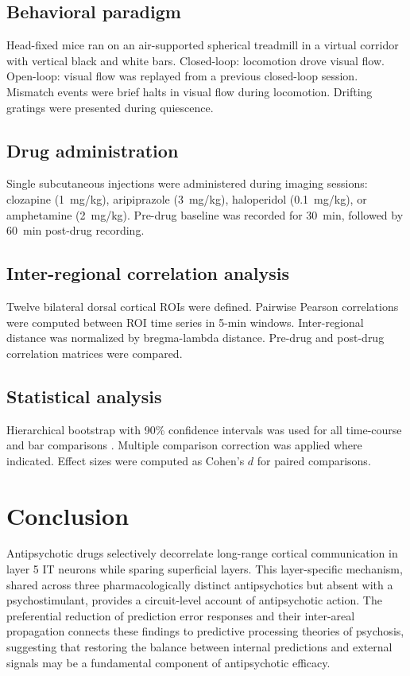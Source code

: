 \documentclass[11pt]{article}
\begin{document}
\subsection{Behavioral paradigm}

Head-fixed mice ran on an air-supported spherical treadmill in a virtual corridor with vertical black and white bars. Closed-loop: locomotion drove visual flow. Open-loop: visual flow was replayed from a previous closed-loop session. Mismatch events were brief halts in visual flow during locomotion. Drifting gratings were presented during quiescence.

\subsection{Drug administration}

Single subcutaneous injections were administered during imaging sessions: clozapine (1~mg/kg), aripiprazole (3~mg/kg), haloperidol (0.1~mg/kg), or amphetamine (2~mg/kg). Pre-drug baseline was recorded for 30~min, followed by 60~min post-drug recording.

\subsection{Inter-regional correlation analysis}

Twelve bilateral dorsal cortical ROIs were defined. Pairwise Pearson correlations were computed between ROI time series in 5-min windows. Inter-regional distance was normalized by bregma-lambda distance. Pre-drug and post-drug correlation matrices were compared.

\subsection{Statistical analysis}

Hierarchical bootstrap with 90\% confidence intervals was used for all time-course and bar comparisons \citep{efron1993bootstrap}. Multiple comparison correction was applied where indicated. Effect sizes were computed as Cohen's $d$ for paired comparisons.

\section{Conclusion}

Antipsychotic drugs selectively decorrelate long-range cortical communication in layer 5 IT neurons while sparing superficial layers. This layer-specific mechanism, shared across three pharmacologically distinct antipsychotics but absent with a psychostimulant, provides a circuit-level account of antipsychotic action. The preferential reduction of prediction error responses and their inter-areal propagation connects these findings to predictive processing theories of psychosis, suggesting that restoring the balance between internal predictions and external signals may be a fundamental component of antipsychotic efficacy.



\end{document}
